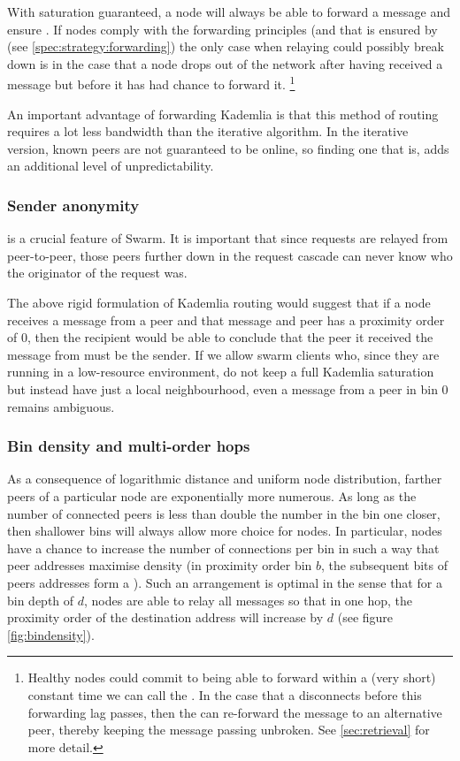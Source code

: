 With  saturation guaranteed, a node will always be able to forward a message and ensure . If nodes comply with the forwarding principles (and that is ensured by  (see \ref{spec:strategy:forwarding}) the only case when relaying could possibly break down is in the case that a node drops out of the network after having received a message but before it has had chance to forward it.%
%
\footnote{Healthy nodes could commit to being able to forward within a (very short) constant time we can call the . In the case that a  disconnects before this forwarding lag passes, then the  can re-forward the message to an alternative peer, thereby keeping the message passing unbroken. See \ref{sec:retrieval} for more detail.
} 

An important advantage of forwarding Kademlia is that this method of routing requires a lot less bandwidth than the iterative algorithm. In the iterative version, known peers are not guaranteed to be online, so finding one that is, adds an additional level of unpredictability.

\subsubsection{Sender anonymity}
 is a crucial feature of  Swarm. It is important that since requests are relayed from peer-to-peer, those peers further down in the request cascade can never know who the originator of the request was. 

The above rigid formulation of Kademlia routing would suggest that if a node receives a message from a peer and that message and peer has a proximity order of $0$, then the recipient would be able to conclude that the peer it received the message from must be the sender. If we allow  swarm clients who, since they are running in a low-resource environment, do not keep a full Kademlia saturation but instead have just a local neighbourhood, even a message from a peer in bin $0$ remains ambiguous. 

\subsubsection{Bin density and multi-order hops} \label{sec:bindensity}

As a consequence of logarithmic distance and uniform node distribution, farther peers of a particular node are exponentially more numerous. 
As long as the number of connected peers is less than double the number in the bin one closer, then shallower bins will always allow more choice for nodes. In particular, nodes have a chance to increase the number of connections per bin in such a way that peer addresses maximise density (in proximity order bin $b$, the subsequent bits of peers addresses form a ). Such an arrangement is optimal in the sense that for a bin depth of $d$, nodes are able to relay all messages so that in one hop, the proximity order of the destination address will increase by $d$ (see figure \ref{fig:bindensity}). 


